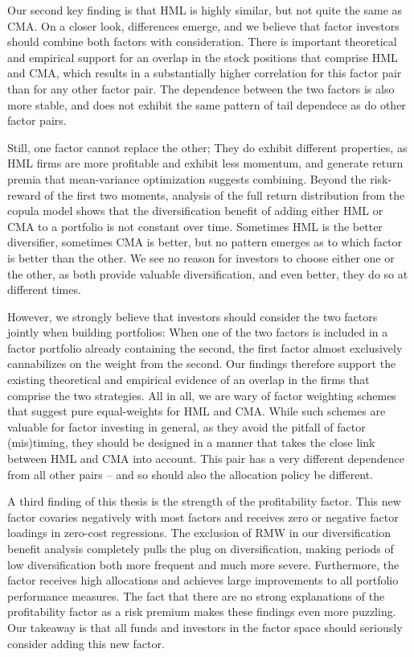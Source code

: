 Our second key finding is that HML is highly similar, but not quite the same as CMA. On a closer look, differences emerge, and we believe that factor investors should combine both factors with consideration. There is important theoretical and empirical support for an overlap in the stock positions that comprise HML and CMA, which results in a substantially higher correlation for this factor pair than for any other factor pair. The dependence between the two factors is also more stable, and does not exhibit the same pattern of tail dependece as do other factor pairs. 

Still, one factor cannot replace the other; They do exhibit different properties, as HML firms are more profitable and exhibit less momentum, and generate return premia that mean-variance optimization suggests combining. Beyond the risk-reward of the first two moments, analysis of the full return distribution from the copula model shows that the diversification benefit of adding either HML or CMA to a portfolio is not constant over time. Sometimes HML is the better diversifier, sometimes CMA is better, but no pattern emerges as to which factor is better than the other. We see no reason for investors to choose either one or the other, as both provide valuable diversification, and even better, they do so at different times.

However, we strongly believe that investors should consider the two factors jointly when building portfolios: When one of the two factors is included in a factor portfolio already containing the second, the first factor almost exclusively cannabilizes on the weight from the second. Our findings therefore support the existing theoretical and empirical evidence of an overlap in the firms that comprise the two strategies. All in all, we are wary of factor weighting schemes that suggest pure equal-weights for HML and CMA. While such schemes are valuable for factor investing in general, as they avoid the pitfall of factor (mis)timing, they should be designed in a manner that takes the close link between HML and CMA into account. This pair has a very different dependence from all other pairs -- and so should also the allocation policy be different.

A third finding of this thesis is the strength of the profitability factor. This new factor covaries negatively with most factors and receives zero or negative factor loadings in zero-cost regressions. The exclusion of RMW in our diversification benefit analysis completely pulls the plug on diversification, making periods of low diversification both more frequent and much more severe. Furthermore, the factor receives high allocations and achieves large improvements to all portfolio performance measures. The fact that there are no strong explanations of the profitability factor as a risk premium makes these findings even more puzzling. Our takeaway is that all funds and investors in the factor space should seriously consider adding this new factor.

